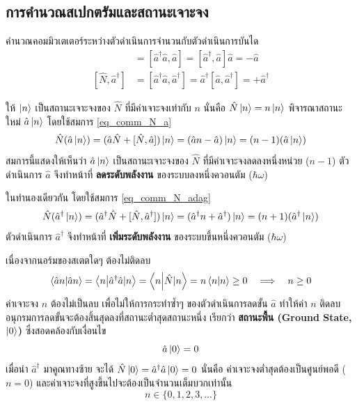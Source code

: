 \subsection{การคำนวณสเปกตรัมและสถานะเจาะจง}
คำนวณคอมมิวเตเตอร์ระหว่างตัวดำเนินการจำนวนกับตัวดำเนินการบันได
\begin{align}
[\hat{N}, \hat{a}] &= [\hat{a}^\dagger\hat{a}, \hat{a}] = [\hat{a}^\dagger, \hat{a}]\hat{a} = -\hat{a} \label{eq_comm_N_a} \\
[\hat{N}, \hat{a}^\dagger] &= [\hat{a}^\dagger\hat{a}, \hat{a}^\dagger] = \hat{a}^\dagger[\hat{a}, \hat{a}^\dagger] = +\hat{a}^\dagger \label{eq_comm_N_adag}
\end{align}

ให้ $\ket{n}$ เป็นสถานะเจาะจงของ $\hat{N}$ ที่มีค่าเจาะจงเท่ากับ $n$ นั่นคือ $\hat{N}\ket{n} = n\ket{n}$
พิจารณาสถานะใหม่ $\hat{a}\ket{n}$ โดยใช้สมการ \eqref{eq_comm_N_a}
\begin{equation}
\hat{N}(\hat{a}\ket{n}) = (\hat{a}\hat{N} + [\hat{N}, \hat{a}])\ket{n} = (\hat{a}n - \hat{a})\ket{n} = (n - 1)(\hat{a}\ket{n})
\end{equation}
สมการนี้แสดงให้เห็นว่า $\hat{a}\ket{n}$ เป็นสถานะเจาะจงของ $\hat{N}$ ที่มีค่าเจาะจงลดลงหนึ่งหน่วย ($n - 1$) ตัวดำเนินการ $\hat{a}$ จึงทำหน้าที่ \textbf{ลดระดับพลังงาน} ของระบบลงหนึ่งควอนตัม ($\hbar\omega$)

ในทำนองเดียวกัน โดยใช้สมการ \eqref{eq_comm_N_adag}
\begin{equation}
\hat{N}(\hat{a}^\dagger\ket{n}) = (\hat{a}^\dagger\hat{N} + [\hat{N}, \hat{a}^\dagger])\ket{n} = (\hat{a}^\dagger n + \hat{a}^\dagger)\ket{n} = (n + 1)(\hat{a}^\dagger\ket{n})
\end{equation}
ตัวดำเนินการ $\hat{a}^\dagger$ จึงทำหน้าที่ \textbf{เพิ่มระดับพลังงาน} ของระบบขึ้นหนึ่งควอนตัม ($\hbar\omega$)

เนื่องจากนอร์มของสเตตใดๆ ต้องไม่ติดลบ
\begin{equation}
\braket{\hat{a}n}{\hat{a}n} = \braket{n}{\hat{a}^\dagger\hat{a}|n} = \braket{n}{\hat{N}|n} = n\braket{n}{n} \ge 0 \quad \Longrightarrow \quad n \ge 0
\end{equation}
ค่าเจาะจง $n$ ต้องไม่เป็นลบ เพื่อไม่ให้การกระทำซ้ำๆ ของตัวดำเนินการลดขั้น $\hat{a}$ ทำให้ค่า $n$ ติดลบ อนุกรมการลดขั้นจะต้องสิ้นสุดลงที่สถานะต่ำสุดสถานะหนึ่ง เรียกว่า \textbf{สถานะพื้น (Ground State, $\ket{0}$)} ซึ่งสอดคล้องกับเงื่อนไข
\begin{equation}
\hat{a}\ket{0} = 0 \label{eq_annihilate_ground}
\end{equation}
เมื่อนำ $\hat{a}^\dagger$ มาคูณทางซ้าย จะได้ $\hat{N}\ket{0} = \hat{a}^\dagger\hat{a}\ket{0} = 0$ นั่นคือ ค่าเจาะจงต่ำสุดต้องเป็นศูนย์พอดี ($n = 0$) และค่าเจาะจงที่สูงขึ้นไปจะต้องเป็นจำนวนเต็มบวกเท่านั้น
\begin{equation}
n \in \{0, 1, 2, 3, \dots\}
\end{equation}

